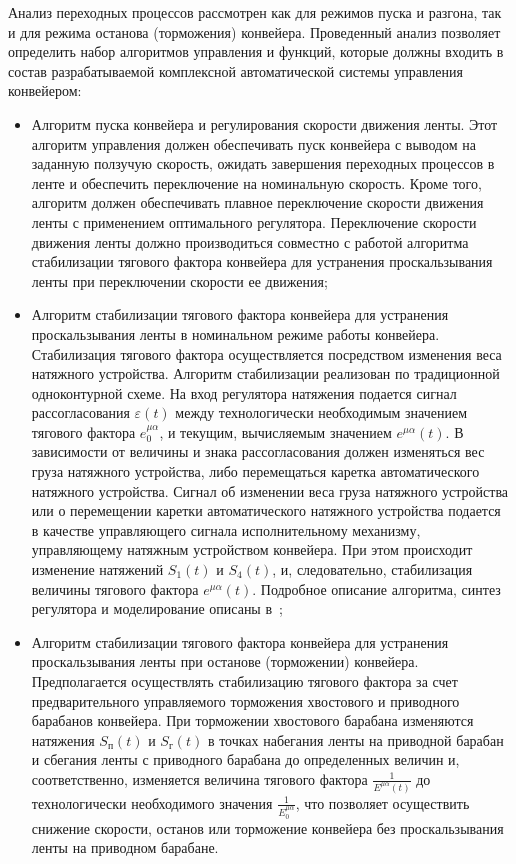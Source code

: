 Анализ переходных процессов рассмотрен как для режимов пуска и разгона, так и для режима останова (торможения) конвейера. Проведенный анализ позволяет определить набор алгоритмов управления и функций, которые должны входить в состав разрабатываемой комплексной автоматической системы управления конвейером:
\begin{itemize}
\item Алгоритм пуска конвейера и регулирования скорости движения ленты. Этот алгоритм управления должен обеспечивать пуск конвейера с выводом на заданную ползучую скорость, ожидать завершения переходных процессов в ленте и обеспечить переключение на номинальную скорость. Кроме того, алгоритм должен обеспечивать плавное переключение скорости движения ленты с применением оптимального регулятора. Переключение скорости движения ленты должно производиться совместно с работой алгоритма стабилизации тягового фактора конвейера для устранения проскальзывания ленты при переключении скорости ее движения;
\item Алгоритм стабилизации тягового фактора конвейера для устранения проскальзывания ленты в номинальном режиме работы конвейера. Стабилизация тягового фактора осуществляется посредством изменения веса натяжного устройства. Алгоритм стабилизации реализован по традиционной одноконтурной схеме. На вход регулятора натяжения подается сигнал рассогласования $ \varepsilon(t) $ между технологически необходимым значением тягового фактора $ e_0^{\mu \alpha} $, и текущим, вычисляемым значением $ e^{\mu \alpha}(t) $. В зависимости от величины и знака рассогласования должен изменяться вес груза натяжного устройства, либо перемещаться каретка автоматического натяжного устройства. Сигнал об изменении веса груза натяжного устройства или о перемещении каретки автоматического натяжного устройства подается в качестве управляющего сигнала исполнительному механизму, управляющему натяжным устройством конвейера. При этом происходит изменение натяжений $ S_1(t) $ и $ S_4(t) $, и, следовательно, стабилизация величины тягового фактора $ e^{\mu \alpha}(t) $. Подробное описание алгоритма, синтез регулятора и моделирование описаны в~\cite{vdmitrieva};
\item Алгоритм стабилизации тягового фактора конвейера для устранения проскальзывания ленты при останове (торможении) конвейера. Предполагается осуществлять стабилизацию тягового фактора за счет предварительного управляемого торможения хвостового и приводного барабанов конвейера. При торможении хвостового барабана изменяются натяжения $ S_{\text{п}}(t) $ и $ S_{\text{г}}(t) $ в точках набегания ленты на приводной барабан и сбегания ленты с приводного барабана до определенных величин и, соответственно, изменяется величина тягового фактора $ \frac{1}{E^{\mu \alpha}(t)} $ до технологически необходимого значения $ \frac{1}{E_0^{\mu \alpha}} $, что позволяет осуществить снижение скорости, останов или торможение конвейера без проскальзывания ленты на приводном барабане. 


\end{itemize}
